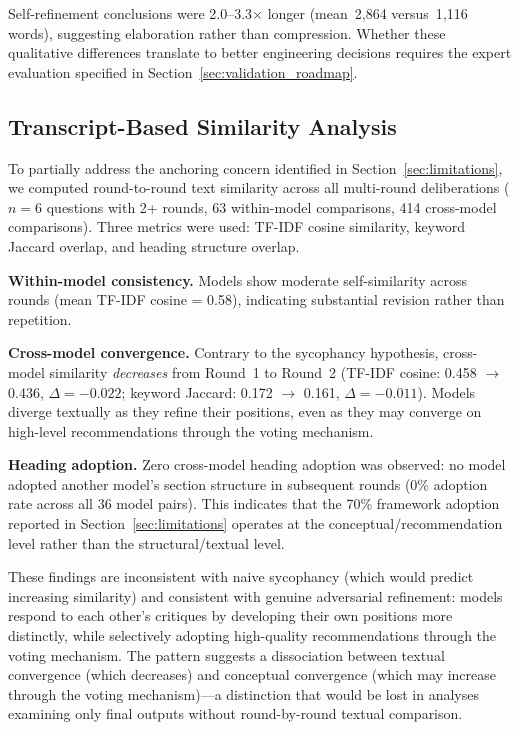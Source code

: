 \documentclass[11pt,a4paper]{article}
\begin{document}
Self-refinement conclusions were 2.0--3.3$\times$ longer (mean~2{,}864 versus~1{,}116 words), suggesting elaboration rather than compression. Whether these qualitative differences translate to better engineering decisions requires the expert evaluation specified in Section~\ref{sec:validation_roadmap}.

\subsection{Transcript-Based Similarity Analysis}
\label{sec:similarity}

To partially address the anchoring concern identified in Section~\ref{sec:limitations}, we computed round-to-round text similarity across all multi-round deliberations ($n = 6$ questions with 2+ rounds, 63 within-model comparisons, 414 cross-model comparisons). Three metrics were used: TF-IDF cosine similarity, keyword Jaccard overlap, and heading structure overlap.

\textbf{Within-model consistency.} Models show moderate self-similarity across rounds (mean TF-IDF cosine = 0.58), indicating substantial revision rather than repetition.

\textbf{Cross-model convergence.} Contrary to the sycophancy hypothesis, cross-model similarity \emph{decreases} from Round~1 to Round~2 (TF-IDF cosine: 0.458 $\to$ 0.436, $\Delta = -0.022$; keyword Jaccard: 0.172 $\to$ 0.161, $\Delta = -0.011$). Models diverge textually as they refine their positions, even as they may converge on high-level recommendations through the voting mechanism.

\textbf{Heading adoption.} Zero cross-model heading adoption was observed: no model adopted another model's section structure in subsequent rounds (0\% adoption rate across all 36 model pairs). This indicates that the 70\% framework adoption reported in Section~\ref{sec:limitations} operates at the conceptual/recommendation level rather than the structural/textual level.

These findings are inconsistent with naive sycophancy (which would predict increasing similarity) and consistent with genuine adversarial refinement: models respond to each other's critiques by developing their own positions more distinctly, while selectively adopting high-quality recommendations through the voting mechanism. The pattern suggests a dissociation between textual convergence (which decreases) and conceptual convergence (which may increase through the voting mechanism)---a distinction that would be lost in analyses examining only final outputs without round-by-round textual comparison.
\end{document}
